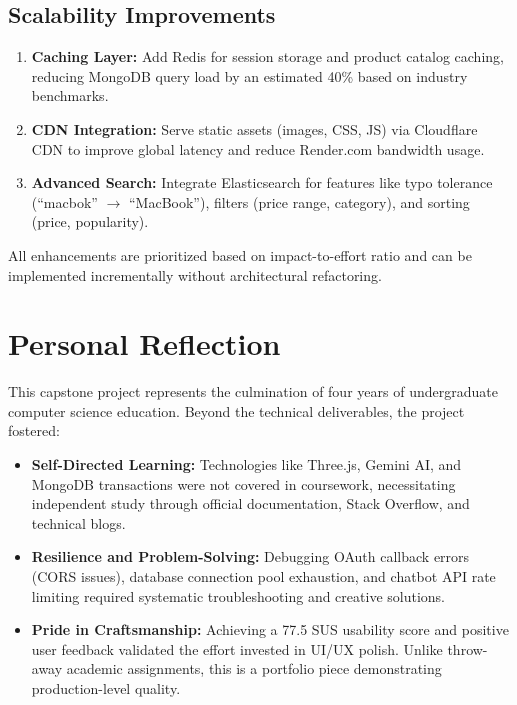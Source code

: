 \documentclass[12pt, a4paper]{report}
\begin{document}
{{\subsection{Scalability Improvements}

\begin{enumerate}
    \item \textbf{Caching Layer:} Add Redis for session storage and product catalog caching, reducing MongoDB query load by an estimated 40\% based on industry benchmarks.
    
    \item \textbf{CDN Integration:} Serve static assets (images, CSS, JS) via Cloudflare CDN to improve global latency and reduce Render.com bandwidth usage.
    
    \item \textbf{Advanced Search:} Integrate Elasticsearch for features like typo tolerance (``macbok'' $\rightarrow$ ``MacBook''), filters (price range, category), and sorting (price, popularity).
\end{enumerate}


All enhancements are prioritized based on impact-to-effort ratio and can be implemented incrementally without architectural refactoring.

\section{Personal Reflection}

This capstone project represents the culmination of four years of undergraduate computer science education. Beyond the technical deliverables, the project fostered:

\begin{itemize}
    \item \textbf{Self-Directed Learning:} Technologies like Three.js, Gemini AI, and MongoDB transactions were not covered in coursework, necessitating independent study through official documentation, Stack Overflow, and technical blogs.
    
    \item \textbf{Resilience and Problem-Solving:} Debugging OAuth callback errors (CORS issues), database connection pool exhaustion, and chatbot API rate limiting required systematic troubleshooting and creative solutions.
    
    \item \textbf{Pride in Craftsmanship:} Achieving a 77.5 SUS usability score and positive user feedback validated the effort invested in UI/UX polish. Unlike throw-away academic assignments, this is a portfolio piece demonstrating production-level quality.
\end{itemize}

}}
\end{document}
